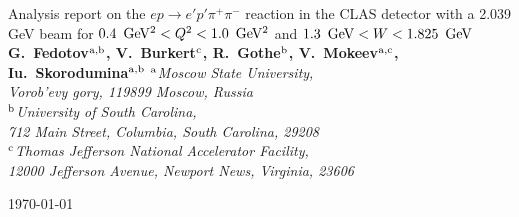 \thispagestyle{empty}
\begin{center} {\large } \end{center}

\vskip148pt


\begin{center}

{\Large Analysis report on the $e p \rightarrow e' p'
\pi^{+} \pi^{-}$
reaction in the CLAS detector with a 2.039 GeV beam for
$0.4\enskip {\rm GeV^{2}} < Q^{2} < 1.0\enskip {\rm GeV^{2}}$ and
$1.3\enskip {\rm GeV} < W <1.825\enskip {\rm GeV}$}
\vskip18pt
{\bf G.~Fedotov$^{\rm a,b}$, V.~Burkert$^{\rm
c}$,  R.~Gothe$^{\rm b}$,
V.~Mokeev$^{\rm a,c}$, Iu.~Skorodumina$^{\rm a,b}$}
\vskip10pt
{\it $^{\rm a}$Moscow State University, \\[-8pt]
Vorob'evy gory, 119899 Moscow, Russia \\[1pt]
$^{\rm b}$University of South Carolina, \\[-8pt]
712 Main Street, Columbia, South Carolina, 29208 \\[1pt]
$^{\rm c}$Thomas Jefferson National Accelerator Facility, \\[-8pt]
12000 Jefferson Avenue, Newport News, Virginia, 23606}

\vspace*{3\baselineskip}

\today

\end{center}






